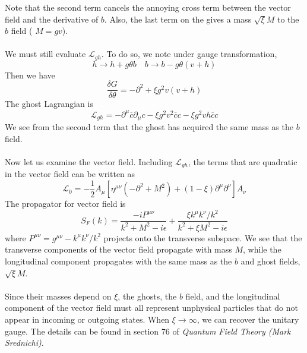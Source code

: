Note that the second term cancels the annoying cross term between the vector field and the derivative of $b$. Also, the last term on the gives a mass $\sqrt{\xi}M$ to the $b$ field ( $M = gv$).
\\ \\
We must still evaluate $\mathcal{L}_{gh}$. To do so, we note under gauge transformation,
\[h \to h + g\theta b \quad b \to b - g\theta(v+h)\]
Then we have
\[\frac{\delta G}{\delta \theta} = -\partial^2 + \xi g^2 v(v+h)\]
The ghost Lagrangian is
\[\mathcal{L}_{gh} = -\partial^{\mu}\overline{c}\partial_{\mu}c - \xi g^2v^2\overline{c}c - \xi g^2 vh\overline{c}c\]
We see from the second term that the ghost has acquired the same mass as the $b$ field.
\\ \\
Now let us examine the vector field. Including $\mathcal{L}_{gh}$, the terms that are quadratic in the vector field can be written as
\[\mathcal{L}_0 = - \frac{1}{2}A_{\mu} \left[ \eta^{\mu\nu}(-\partial^2 + M^2) + (1 - \xi)\partial^{\mu}\partial^{\nu} \right] A_{\nu}\]
The propagator for vector field is
\[S_F(k) = \frac{-iP^{\mu\nu}}{k^2+M^2-i\epsilon} + \frac{\xi k^{\mu}k^{\nu}/k^2}{k^2+ \xi M^2-i\epsilon}\]
where $P^{\mu\nu} = g^{\mu\nu} - k^{\mu}k^{\nu}/k^2$ projects onto the transverse subspace. We see that the transverse components of the vector field propagate with mass $M$, while the longitudinal component propagates with the same mass as the $b$ and ghost fields, $\sqrt{\xi}M$.
\\ \\
Since their masses depend on $\xi$, the ghosts, the $b$ field, and the longitudinal component of the vector field must all represent unphysical particles that do not appear in incoming or outgoing states. When $\xi \to \infty$, we can recover the unitary gauge. The details can be found in section 76 of \emph{Quantum Field Theory (Mark Srednichi)}.

